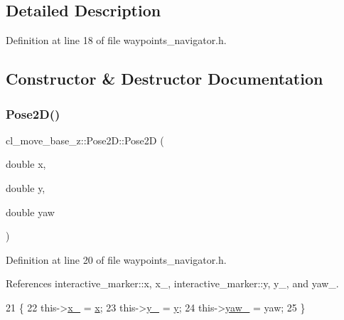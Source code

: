 \subsection{Detailed Description}


Definition at line 18 of file waypoints\+\_\+navigator.\+h.



\subsection{Constructor \& Destructor Documentation}
\mbox{\label{structcl__move__base__z_1_1Pose2D_ac84fa69c2c2dda7ec107a52e9f2c2fcf}} 
\subsubsection{\texorpdfstring{Pose2\+D()}{Pose2D()}}
{\footnotesize\ttfamily cl\+\_\+move\+\_\+base\+\_\+z\+::\+Pose2\+D\+::\+Pose2D (\begin{DoxyParamCaption}\item[{double}]{x,  }\item[{double}]{y,  }\item[{double}]{yaw }\end{DoxyParamCaption})\hspace{0.3cm}{\ttfamily [inline]}}



Definition at line 20 of file waypoints\+\_\+navigator.\+h.



References interactive\+\_\+marker\+::x, x\+\_\+, interactive\+\_\+marker\+::y, y\+\_\+, and yaw\+\_\+.


\begin{DoxyCode}
21   \{
22     this->\hyperlink{structcl__move__base__z_1_1Pose2D_a5cf116d8264305c3cf062e573f218854}{x\_} = \hyperlink{namespaceinteractive__marker_acda52804aef30b460a72fb21ee01d69d}{x};
23     this->\hyperlink{structcl__move__base__z_1_1Pose2D_a745b752ce659fca634aaa386230bb931}{y\_} = \hyperlink{namespaceinteractive__marker_a5e45ec67a60dd2f10e5b53a9274e4730}{y};
24     this->\hyperlink{structcl__move__base__z_1_1Pose2D_aed88c69c4fb64fdca72534843de5350e}{yaw\_} = yaw;
25   \}
\end{DoxyCode}


